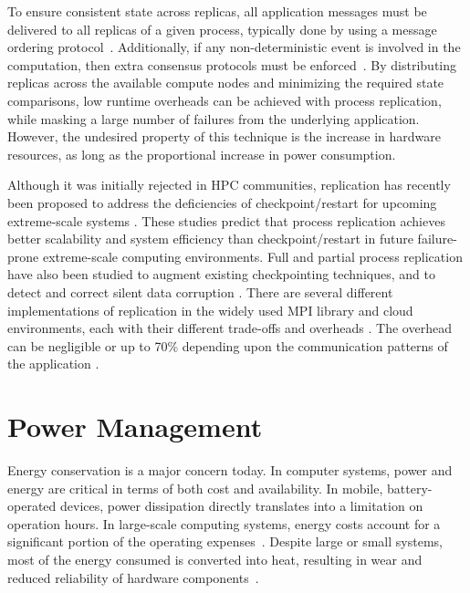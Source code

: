 To ensure consistent state across replicas, all application messages must be delivered to all replicas of a given process, typically done by using a message ordering protocol~\cite{defago2004total,baldoni2005total}. Additionally, if any non-deterministic event is involved in the computation,  then extra consensus protocols must be enforced~\cite{lamport1998part,zhao2010fault}. 
By distributing replicas across the available compute nodes and minimizing the required state comparisons, low runtime overheads can be achieved with process replication, while masking a large number of failures from the underlying application. However, the undesired property of this technique is the increase in hardware resources, as long as the proportional increase in power consumption.


Although it was initially rejected in HPC communities, 
replication has recently been proposed to address the deficiencies of checkpoint/restart for upcoming extreme-scale systems \cite{Cappello:09:Fault,engelmann2011redundant,riesen_sandia_2010,ferreira_sc_2011}. These studies predict that process replication achieves better scalability and system efficiency than checkpoint/restart in future failure-prone extreme-scale computing environments. 
Full and partial
process replication have also been studied to augment existing checkpointing techniques, and to  
detect and correct silent data corruption \cite{stearly_2012_partial,elliott_2012_cpr,ferreira_sc_2011,fiala_2012_sdc,ni_2013_acr,lefray_2013_rsd}. There are several different implementations of
replication in the widely used MPI library and cloud environments, each with their different trade-offs and overheads \cite{engelmann2011redundant,ferreira_sc_2011,zhao2010fault}. The
overhead can be negligible or up to 70\% depending upon the communication patterns of the
application \cite{engelmann2011redundant}. %



\section{Power Management}
Energy conservation is a major concern today. In computer systems, power and energy are critical in terms of both cost and availability. In mobile, battery-operated devices, power dissipation directly translates into a limitation on operation hours. In large-scale computing systems, energy costs account for a significant portion of the operating expenses~\cite{scaramella2014worldwide}. Despite large or small systems, most of the energy consumed is converted into heat, resulting in wear and reduced reliability of hardware components~\cite{sarood_2013_CWI,Albers:2010:EA:1735223.1735245}.


